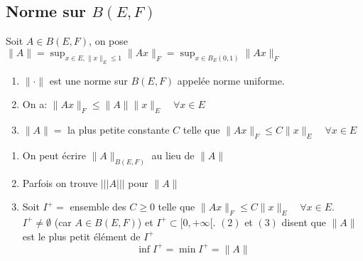 \documentclass[a4paper]{report}
\renewcommand\O{\ensuremath{\emptyset}}
\theoremstyle{definition}
\begin{document}
\subsection{Norme sur $B(E, F)$}
\begin{theorem}
    Soit $A \in B(E, F)$, on pose $\displaystyle \|A\| = \sup_{x \in E, \|x\|_E \le 1} \|Ax\|_F = \sup_{x \in B_E(0, 1)} \|Ax\|_{F}$

    \begin{enumerate}
        \item $\| \cdot \|$ est une norme sur  $B(E, F)$ appelée norme uniforme.
        \item On a:  $\|Ax\|_F \le \|A\|\|x\|_{E} \quad \forall x \in E$
        \item $\|A\| = $ la plus petite constante  $C$ telle que  $\|Ax\|_{F} \le C\|x\|_{E} \quad \forall x \in E$
    \end{enumerate}
\end{theorem}
\begin{remark}
    \begin{enumerate}
        \item On peut écrire $\|A\|_{B(E, F)}$ au lieu de $\|A\|$ 
        \item Parfois on trouve $|||A|||$ pour $\|A\|$ 
        \item Soit $I^+ = $ ensemble des  $C \ge 0$ telle que $\|Ax\|_{F} \le C\|x\|_{E} \quad \forall x \in E$. \\
            $I^+ \neq \O$ (car $A \in B(E, F)$) et $I^+ \subset [0, +\infty[$. $(2)$ et  $(3)$ disent que  $\|A\|$ est le plus petit élément de  $I^+$
             \[
            \inf I^+ = \min I^+ = \|A\|
            \] 
    \end{enumerate}
\end{remark}
\end{document}

